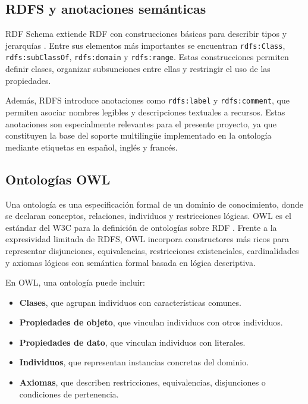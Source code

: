 \subsection{RDFS y anotaciones semánticas}

RDF Schema extiende RDF con construcciones básicas para describir tipos y jerarquías
\parencite{w3c-rdfs2014}. Entre sus elementos más importantes se encuentran
\texttt{rdfs:Class}, \texttt{rdfs:subClassOf}, \texttt{rdfs:domain} y
\texttt{rdfs:range}. Estas construcciones permiten definir clases, organizar
subsunciones entre ellas y restringir el uso de las propiedades.

Además, RDFS introduce anotaciones como \texttt{rdfs:label} y \texttt{rdfs:comment},
que permiten asociar nombres legibles y descripciones textuales a recursos. Estas
anotaciones son especialmente relevantes para el presente proyecto, ya que constituyen
la base del soporte multilingüe implementado en la ontología mediante etiquetas en
español, inglés y francés.

\subsection{Ontologías OWL}

Una ontología es una especificación formal de un dominio de conocimiento, donde se
declaran conceptos, relaciones, individuos y restricciones lógicas. OWL es el estándar
del W3C para la definición de ontologías sobre RDF \parencite{w3c-owl2012}. Frente a la
expresividad limitada de RDFS, OWL incorpora constructores más ricos para representar
disjunciones, equivalencias, restricciones existenciales, cardinalidades y axiomas
lógicos con semántica formal basada en lógica descriptiva.

En OWL, una ontología puede incluir:

\begin{itemize}
  \item \textbf{Clases}, que agrupan individuos con características comunes.
  \item \textbf{Propiedades de objeto}, que vinculan individuos con otros individuos.
  \item \textbf{Propiedades de dato}, que vinculan individuos con literales.
  \item \textbf{Individuos}, que representan instancias concretas del dominio.
  \item \textbf{Axiomas}, que describen restricciones, equivalencias, disjunciones o
  condiciones de pertenencia.
\end{itemize}

